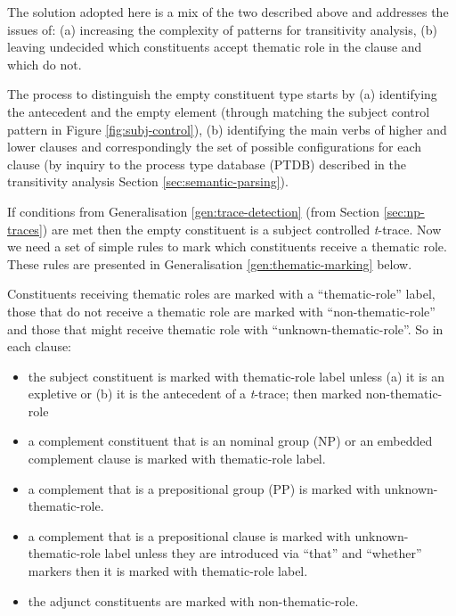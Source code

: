     The solution adopted here is a mix of the two described above and addresses the issues of: (a) increasing the complexity of patterns for transitivity analysis, (b) leaving undecided which constituents accept thematic role in the clause and which do not. 

    The process to distinguish the empty constituent type starts by (a) identifying the antecedent and the empty element (through matching the subject control pattern in Figure \ref{fig:subj-control}), (b) identifying the main verbs of higher and lower clauses and correspondingly the set of possible configurations for each clause (by inquiry to the process type database (PTDB) described in the transitivity analysis Section \ref{sec:semantic-parsing}).

    If conditions from Generalisation \ref{gen:trace-detection} (from Section \ref{sec:np-traces}) are met then the empty constituent is a subject controlled \textit{t}-trace. Now we need a set of simple rules to mark which constituents receive a thematic role. These rules are  presented in Generalisation \ref{gen:thematic-marking} below.

    \begin{generalization}\label{gen:thematic-marking}
        Constituents receiving thematic roles are marked with a ``thematic-role'' label, those that do not receive a thematic role are marked with ``non-thematic-role'' and those that might receive thematic role with ``unknown-thematic-role''. So in each clause:
        \begin{itemize}
            \item the subject constituent is marked with thematic-role label unless (a) it is an expletive or (b) it is the antecedent of a \textit{t}-trace; then marked non-thematic-role
            \item a complement constituent that is an nominal group (NP) or an embedded complement clause is marked with thematic-role label.
            \item a  complement that is a prepositional group (PP) is marked with unknown-thematic-role.
            \item a complement that is a prepositional clause is marked with unknown-thematic-role label unless they are introduced via ``that'' and ``whether'' markers then it is marked with thematic-role label.
            \item the adjunct constituents are marked with non-thematic-role.
        \end{itemize}
    \end{generalization}

